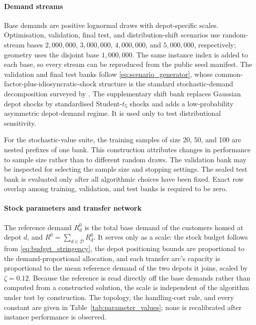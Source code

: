 \documentclass[authoryear,final,3p,times]{elsarticle}
\theoremstyle{definition}
\theoremstyle{plain}
\begin{document}
\paragraph{Demand streams}
Base demands are positive lognormal draws with depot-specific scales.  Optimisation, validation, final test, and distribution-shift scenarios use random-stream bases $2{,}000{,}000$, $3{,}000{,}000$, $4{,}000{,}000$, and $5{,}000{,}000$, respectively; geometry uses the disjoint base $1{,}000{,}000$.  The same instance index is added to each base, so every stream can be reproduced from the public seed manifest.  The validation and final test banks follow \eqref{eq:scenario_generator}, whose common-factor-plus-idiosyncratic-shock structure is the standard stochastic-demand decomposition surveyed by \citet{gendreau1996stochastic}.  The supplementary shift bank replaces Gaussian depot shocks by standardised Student-$t_5$ shocks and adds a low-probability asymmetric depot-demand regime.  It is used only to test distributional sensitivity.

For the stochastic-value suite, the training samples of size 20, 50, and 100 are nested prefixes of one bank.  This construction attributes changes in performance to sample size rather than to different random draws.  The validation bank may be inspected for selecting the sample size and stopping settings.  The sealed test bank is evaluated only after all algorithmic choices have been fixed.  Exact row overlap among training, validation, and test banks is required to be zero.

\paragraph{Stock parameters and transfer network}
The reference demand $R^0_d$ is the total base demand of the customers homed at depot $d$, and $R^0=\sum_{d\in\mathcal D}R^0_d$.  It serves only as a scale: the stock budget follows from \eqref{eq:budget_stringency}, the depot positioning bounds are proportional to the demand-proportional allocation, and each transfer arc's capacity is proportional to the mean reference demand of the two depots it joins, scaled by $\zeta=0.12$.  Because the reference is read directly off the base demands rather than computed from a constructed solution, the scale is independent of the algorithm under test by construction.  The topology, the handling-cost rule, and every constant are given in Table~\ref{tab:parameter_values}; none is recalibrated after instance performance is observed.
\end{document}
